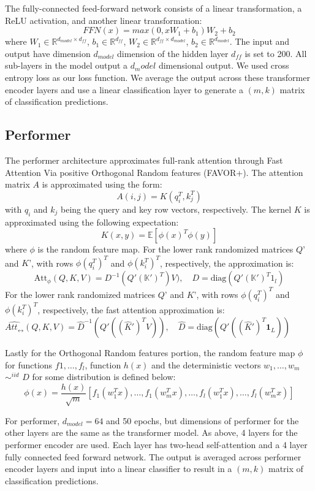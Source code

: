 \documentclass{article}
\begin{document}
The fully-connected feed-forward network consists of a linear transformation, a ReLU activation, and another linear transformation:
$$
FFN(x) = max(0,xW_1 + b_1)W_2 + b_2
$$
where $W_1 \in \mathbb{R}^{d_{model} \times d_{ff}}$, $b_1 \in \mathbb{R}^{d_{ff}}$, $W_2 \in \mathbb{R}^{d_{ff} \times d_{model}}$, $b_2 \in \mathbb{R}^{d_{model}}$. The input and output have dimension $d_{model}$ dimension of the hidden layer $d_{ff}$ is set to 200. All sub-layers in the model output a $d_model$ dimensional output. We used cross entropy loss as our loss function. We average the output across these transformer encoder layers and use a linear classification layer to generate a $(m,k)$ matrix of classification predictions. 

\subsection{Performer}

The performer architecture \cite{choromanskiRethinkingAttentionPerformers2022} approximates full-rank attention through Fast Attention Via positive Orthogonal Random features (FAVOR+). The attention matrix $A$ is approximated using the form:
$$
A(i,j) = K(q_i^T, k_j^T)
$$
with $q_i$ and $k_j$ being the query and key row vectors, respectively. The kernel $K$ is approximated using the following expectation:
$$
K(x,y) = \mathbb{E}\left[ \phi(x)^T \phi(y) \right]
$$
where $\phi$ is the random feature map. For the lower rank randomized matrices $Q’$ and $K’$, with rows $\phi(q_i^T)^T$ and $\phi(k_i^T)^T$, respectively, the approximation is:
$$
\text{Att}_{\phi}(Q, K, V) = D^{-1}(Q'(\mathbb{K}')^T)V), \quad D = \text{diag}(Q'(\mathbb{K}')^T1_l)
$$
For the lower rank randomized matrices $Q’$ and $K’$, with rows $\phi(q_i^T)^T$ and $\phi(k_i^T)^T$, respectively, the fast attention approximation is:
$\widehat{Att_{\leftrightarrow}}(Q, K, V) = \hat{D}^{-1}(Q'((\hat{K}')^T V)), \quad \hat{D} = \text{diag}(Q'((\hat{K}')^T \mathbf{1}_L))$

Lastly for the Orthogonal Random features portion, the random feature map $\phi$ for functions $f1, \dots, f_l$, function $h(x)$ and the deterministic vectors $w_1, \dots, w_m$ $\sim^{iid}$ $D$ for some distribution is defined below:
$$
\phi(x) = \frac{h(x)}{\sqrt{m}} \left[ f_1(w_1^T x), \dots, f_1(w_m^T x), \dots, f_l(w_1^T x), \dots, f_l(w_m^T x) \right]
$$

For performer, $d_{model} = 64$ and 50 epochs, but dimensions of performer for the other layers are the same as the transformer model. As above, 4 layers for the performer encoder are used. Each layer has two-head self-attention and a 4 layer fully connected feed forward network. The output is averaged across performer encoder layers and input into a linear classifier to result in a $(m,k)$ matrix of classification predictions.
\end{document}
